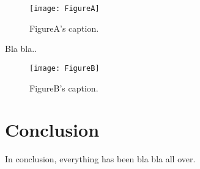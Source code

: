 \begin{figure}[tbh]
\begin{center}
\noindent
  \texttt{[image: FigureA]}
  \end{center}
    \caption{FigureA's caption.}\label{FigureA}
\end{figure}

Bla bla..

\begin{figure}[tbh]
\begin{center}
\noindent
  \texttt{[image: FigureB]}
  \end{center}
    \caption{FigureB's caption.}\label{FigureB}
\end{figure}

\section{Conclusion}

In conclusion, everything has been bla bla all over.
